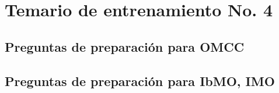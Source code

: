 



\section*{Temario de entrenamiento No. 4}

\subsection*{Preguntas de preparación para OMCC}









\pagebreak

\subsection*{Preguntas de preparación para IbMO, IMO}







